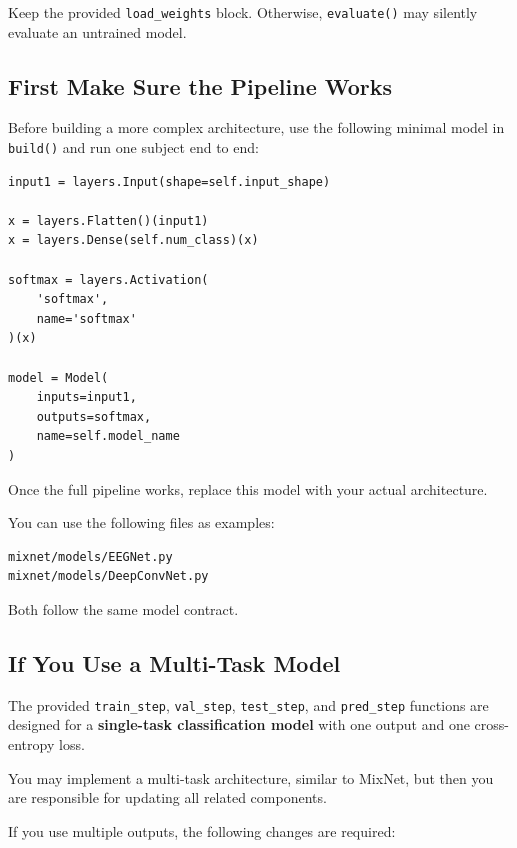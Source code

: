 \documentclass[
  10pt,
]{article}
\begin{document}
Keep the provided \texttt{load\_weights} block. Otherwise,
\texttt{evaluate()} may silently evaluate an untrained model.

\subsection{First Make Sure the Pipeline
Works}\label{first-make-sure-the-pipeline-works}

Before building a more complex architecture, use the following minimal
model in \texttt{build()} and run one subject end to end:

\begin{verbatim}
input1 = layers.Input(shape=self.input_shape)

x = layers.Flatten()(input1)
x = layers.Dense(self.num_class)(x)

softmax = layers.Activation(
    'softmax',
    name='softmax'
)(x)

model = Model(
    inputs=input1,
    outputs=softmax,
    name=self.model_name
)
\end{verbatim}

Once the full pipeline works, replace this model with your actual
architecture.

You can use the following files as examples:

\begin{verbatim}
mixnet/models/EEGNet.py
mixnet/models/DeepConvNet.py
\end{verbatim}

Both follow the same model contract.

\subsection{If You Use a Multi-Task
Model}\label{if-you-use-a-multi-task-model}

The provided \texttt{train\_step}, \texttt{val\_step},
\texttt{test\_step}, and \texttt{pred\_step} functions are designed for
a \textbf{single-task classification model} with one output and one
cross-entropy loss.

You may implement a multi-task architecture, similar to MixNet, but
then you are responsible for updating all related components.

If you use multiple outputs, the following changes are required:
\end{document}
